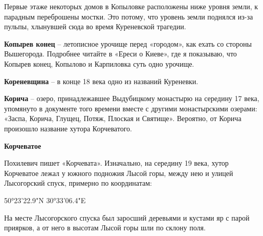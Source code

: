 Первые этаже некоторых домов в Копыловке расположены ниже уровня земли, к парадным переброшены мостки. Это потому, что уровень земли поднялся из-за пульпы, хлынувшей сюда во время Куреневской трагедии.\\

\medskip

\textbf{Копырев конец} – летописное урочище перед «городом», как ехать со стороны Вышегорода. Подробнее читайте в «Ереси о Киеве», где я показываю, что Копырев конец, Копылово и Карпиловка суть одно урочище.\\

\medskip



\textbf{Кореневщина} – в конце 18 века одно из названий Куреневки.\\

\medskip


\textbf{Корича} – озеро, принадлежавшее Выдубицкому монастырю на середину 17 века, упомянуто в документе того времени вместе с другими монастырскими озерами: «Заспа, Корича, Глущец, Потяж, Плоская и Святище». Вероятно, от Корича произошло название хутора Корчеватого.\\

\medskip


\textbf{Корчеватое} 

Похилевич пишет «Корчевата». Изначально, на середину 19 века, хутор Корчеватое лежал у южного подножия Лысой горы, между нею и улицей Лысогорский спуск, примерно по координатам:

50°23'22.9"N 30°33'06.4"E

На месте Лысогорского спуска был заросший деревьями и кустами яр с парой приярков, а от него в высотам Лысой горы шли по склону поля.

